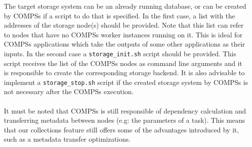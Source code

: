 The target storage system can be an already running database, or can be created by COMPSs if a script to do that is specified. In the first case, a list with the addresses of the storage node(s) should be provided. Note that this list can refer to nodes that have no COMPSs worker instances running on it. This is ideal for COMPSs applications which take the outputs of some other applications as their inputs. In the second case a \verb|storage_init.sh| script should be provided. This script receives the list of the COMPSs nodes as command line arguments and it is responsible to create the corresponding storage backend. It is also advisable to implement a \verb|storage_stop.sh| script if the created storage system by COMPSs is not necessary after the COMPSs execution.\\
\\
It must be noted that COMPSs is still responsible of dependency calculation and  transferring metadata between nodes (e.g: the parameters of a task). This means that our collections feature still offers some of the advantages introduced by it, such as a metadata transfer optimizations.


